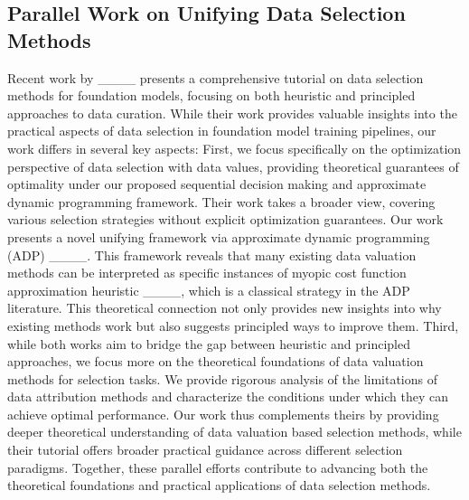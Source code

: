 \subsection{Parallel Work on Unifying Data Selection Methods}
Recent work by ____ presents a comprehensive tutorial on data selection methods for foundation models, focusing on both heuristic and principled approaches to data curation. While their work provides valuable insights into the practical aspects of data selection in foundation model training pipelines, our work differs in several key aspects: First, we focus specifically on the optimization perspective of data selection with data values, providing theoretical guarantees of optimality under our proposed sequential decision making and approximate dynamic programming framework. Their work takes a broader view, covering various selection strategies without explicit optimization guarantees. Our work presents a novel unifying framework via approximate dynamic programming (ADP) ____. This framework reveals that many existing data valuation methods can be interpreted as specific instances of myopic cost function approximation heuristic ____, which is a classical strategy in the ADP literature. This theoretical connection not only provides new insights into why existing methods work but also suggests principled ways to improve them. Third, while both works aim to bridge the gap between heuristic and principled approaches, we focus more on the theoretical foundations of data valuation methods for selection tasks. We provide rigorous analysis of the limitations of data attribution methods and characterize the conditions under which they can achieve optimal performance. Our work thus complements theirs by providing deeper theoretical understanding of data valuation based selection methods, while their tutorial offers broader practical guidance across different selection paradigms. Together, these parallel efforts contribute to advancing both the theoretical foundations and practical applications of data selection methods.